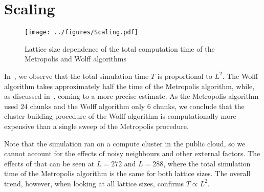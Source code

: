 \section{Scaling}\label{sec:scaling}
	\begin{figure}[htbp]
		\centering
		\texttt{[image: ../figures/Scaling.pdf]}
		\caption[Correlation of the computational effort and the lattice size]{Lattice size dependence of the total computation time of the Metropolis and Wolff algorithms}
		\label{fig:scaling}
	\end{figure}
	In~, we observe that the total simulation time $T$ is proportional to $L^2$. The Wolff algorithm takes approximately half the time of the Metropolis algorithm, while, as discussed in~, coming to a more precise estimate. As the Metropolis algorithm used $24$ chunks and the Wolff algorithm only $6$ chunks, we conclude that the cluster building procedure of the Wolff algorithm is computationally more expensive than a single sweep of the Metropolis procedure.
	
	Note that the simulation ran on a compute cluster in the public cloud, so we cannot account for the effects of noisy neighbours and other external factors. The effects of that can be seen at $L=272$ and $L=288$, where the total simulation time of the Metropolis algorithm is the same for both lattice sizes. The overall trend, however, when looking at all lattice sizes, confirms $T \propto L^2$.